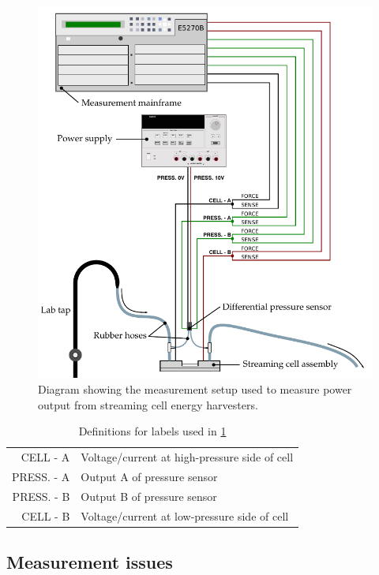     \begin{figure}
        \includegraphics{content/pt1/01-PowerHarvesting/graphics/measurementSetup}
        \caption{\label{fig:measurementSetup}Diagram showing the measurement setup used to measure power output from streaming cell energy harvesters.}
    \end{figure}

    \begin{table}
        \centering
        \begin{tabular}{r|l}
        CELL - A & Voltage/current at high-pressure side of cell\\
        PRESS. - A & Output A of pressure sensor\\
        PRESS. - B & Output B of pressure sensor\\
        CELL - B & Voltage/current at low-pressure side of cell
        \end{tabular}
        \caption{\label{tab:measurementSetup_legend}Definitions for labels used in \cref{fig:measurementSetup}}
    \end{table}


  \subsection{Measurement issues}


